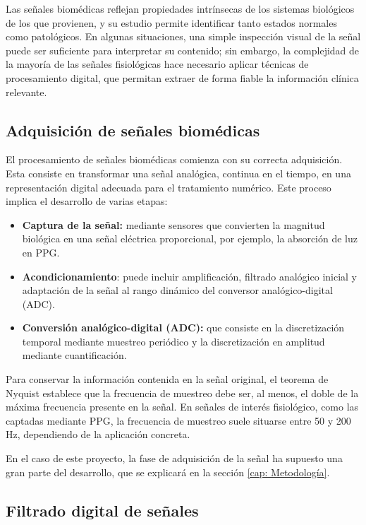 Las señales biomédicas reflejan propiedades intrínsecas de los sistemas biológicos de los que provienen, y su estudio permite identificar tanto estados normales como patológicos. En algunas situaciones, una simple inspección visual de la señal puede ser suficiente para interpretar su contenido; sin embargo, la complejidad de la mayoría de las señales fisiológicas hace necesario aplicar técnicas de procesamiento digital, que permitan extraer de forma fiable la información clínica relevante.

\subsection{Adquisición de señales biomédicas}

El procesamiento de señales biomédicas comienza con su correcta adquisición. Esta consiste en transformar una señal analógica, continua en el tiempo, en una representación digital adecuada para el tratamiento numérico. Este proceso implica el desarrollo de varias etapas:

\begin{itemize}
    \item \textbf{Captura de la señal: }mediante sensores que convierten la magnitud biológica en una señal eléctrica proporcional, por ejemplo, la absorción de luz en PPG.
    \item \textbf{Acondicionamiento}: puede incluir amplificación, filtrado analógico inicial y adaptación de la señal al rango dinámico del conversor analógico-digital (ADC).
    \item \textbf{Conversión analógico-digital (ADC):} que consiste en la discretización temporal mediante muestreo periódico y la discretización en amplitud mediante cuantificación.
\end{itemize}

Para conservar la información contenida en la señal original, el teorema de Nyquist establece que la frecuencia de muestreo debe ser, al menos, el doble de la máxima frecuencia presente en la señal. En señales de interés fisiológico, como las captadas mediante PPG, la frecuencia de muestreo suele situarse entre 50 y 200 Hz, dependiendo de la aplicación concreta.

En el caso de este proyecto, la fase de adquisición de la señal ha supuesto una gran parte del desarrollo, que se explicará en la sección \ref{cap: Metodología}.

\subsection{Filtrado digital de señales}

